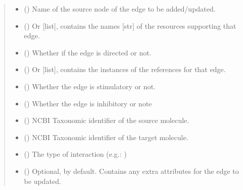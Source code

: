 \documentclass[letterpaper,10pt,english]{sphinxmanual}
\begin{document}
\begin{fulllineitems}
\begin{fulllineitems}
\begin{quote}
\begin{description}
\begin{itemize}
\item {} 
 () \textendash{} Name of the source node of the edge to be added/updated.

\item {} 
 () \textendash{} Or {[}list{]}, contains the names {[}str{]} of the resources
supporting that edge.

\item {} 
 () \textendash{} Whether if the edge is directed or not.

\item {} 
 () \textendash{} Or {[}list{]}, contains the instances of the references
 for that edge.

\item {} 
 () \textendash{} Whether the edge is stimulatory or not.

\item {} 
 () \textendash{} Whether the edge is inhibitory or note

\item {} 
 () \textendash{} NCBI Taxonomic identifier of the source molecule.

\item {} 
 () \textendash{} NCBI Taxonomic identifier of the target molecule.

\item {} 
 () \textendash{} The type of interaction (e.g.: )

\item {} 
 () \textendash{} Optional, \sphinxcode{\sphinxupquote{\{\}}} by default. Contains any extra attributes
for the edge to be updated.


\end{itemize}
\end{description}
\end{quote}
\end{fulllineitems}
\end{fulllineitems}
\end{document}
